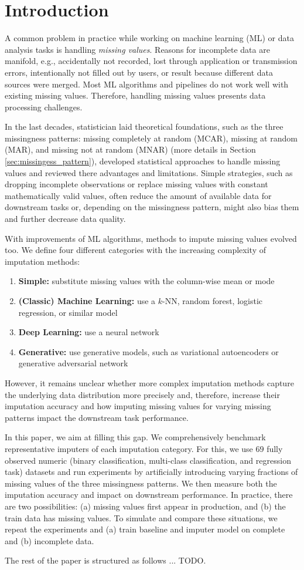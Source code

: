 \section{Introduction}

A common problem in practice while working on machine learning (ML) or data analysis tasks is handling \emph{missing values}. Reasons for incomplete data are manifold, e.g., accidentally not recorded, lost through application or transmission errors, intentionally not filled out by users, or result because different data sources were merged. Most ML algorithms and pipelines do not work well with existing missing values. Therefore, handling missing values presents data processing challenges.

In the last decades, statistician laid theoretical foundations, such as the three missingness patterns: missing completely at random (MCAR), missing at random (MAR), and missing not at random (MNAR) (more details in Section \ref{sec:missingess_pattern}), developed statistical approaches to handle missing values and reviewed there advantages and limitations. Simple strategies, such as dropping incomplete observations or replace missing values with constant mathematically valid values, often reduce the amount of available data for downstream tasks or, depending on the missingness pattern, might also bias them and further decrease data quality.

With improvements of ML algorithms, methods to impute missing values evolved too. We define four different categories with the increasing complexity of imputation methods:
%
\begin{enumerate}
	\item \textbf{Simple:} substitute missing values with the column-wise mean or mode
	\item \textbf{(Classic) Machine Learning:} use a $k$-NN, random forest, logistic regression, or similar model
	\item \textbf{Deep Learning:} use a neural network
	\item \textbf{Generative:} use generative models, such as variational autoencoders or generative adversarial network
\end{enumerate}
%
However, it remains unclear whether more complex imputation methods capture the underlying data distribution more precisely and, therefore, increase their imputation accuracy and how imputing missing values for varying missing patterns impact the downstream task performance.

In this paper, we aim at filling this gap. We comprehensively benchmark representative imputers of each imputation category. For this, we use $69$ fully observed numeric (binary classification, multi-class classification, and regression task) datasets and run experiments by artificially introducing varying fractions of missing values of the three missingness patterns. We then measure both the imputation accuracy and impact on downstream performance. In practice, there are two possibilities: (a) missing values first appear in production, and (b) the train data has missing values. To simulate and compare these situations, we repeat the experiments and (a) train baseline and imputer model on complete and (b) incomplete data.

The rest of the paper is structured as follows ... TODO.
